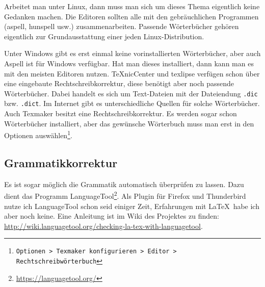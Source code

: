 Arbeitet man unter Linux, dann muss man sich um dieses Thema eigentlich keine Gedanken machen. Die Editoren sollten alle mit den gebräuchlichen Programmen (aspell, hunspell usw.) zusammenarbeiten. Passende Wörterbücher gehören eigentlich zur Grundausstattung einer jeden Linux-Distribution.

Unter Windows gibt es erst einmal keine vorinstallierten Wörterbücher, aber auch Aspell ist für Windows verfügbar. Hat man dieses installiert, dann kann man es mit den meisten Editoren nutzen. TeXnicCenter und texlipse verfügen schon über eine eingebaute Rechtschreibkorrektur, diese benötigt aber noch passende Wörterbücher. Dabei handelt es sich um Text-Dateien mit der Dateiendung \verb+.dic+ bzw. \verb+.dict+. Im Internet gibt es unterschiedliche Quellen für solche Wörterbücher. Auch Texmaker besitzt eine Rechtschreibkorrektur. Es werden sogar schon Wörterbücher installiert, aber das gewünsche Wörterbuch muss man erst in den Optionen auswählen\footnote{\texttt{Optionen > Texmaker konfigurieren > Editor > Rechtschreibwörterbuch}}.

\subsection{Grammatikkorrektur}

Es ist sogar möglich die Grammatik automatisch überprüfen zu lassen. Dazu dient das Programm LanguageTool\footnote{\url{https://languagetool.org/}}. Als Plugin für Firefox und Thunderbird nutze ich LanguageTool schon seid einiger Zeit, Erfahrungen mit \LaTeX\ habe ich aber noch keine. Eine Anleitung ist im Wiki des Projektes zu finden: \url{http://wiki.languagetool.org/checking-la-tex-with-languagetool}.
